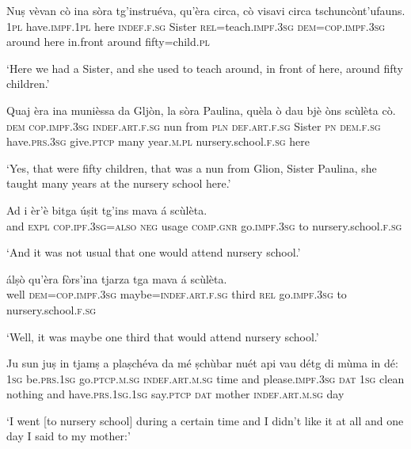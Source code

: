 \begin{linenumbers}
\gll Nuṣ vèvan cò ina sòra tg'instruéva, qu'èra circa, cò visavi circa tschuncònt’ufauns. \\
\textsc{1pl} have.\textsc{impf.1pl} here \textsc{indef.f.sg} Sister \textsc{rel}=teach.\textsc{impf.3sg} \textsc{dem=cop.impf.3sg} around here in.front around fifty=child.\textsc{pl}\\
\end{linenumbers}
\medskip
\glt `Here we had a Sister, and she used to teach around, in front of here, around fifty children.'
\medskip

\begin{linenumbers}
\gll Quaj èra ina munièssa da Gljòn, la sòra Paulina, quèla ò dau bjè òns scùlèta cò.   \\
\textsc{dem} \textsc{cop.impf.3sg} \textsc{indef.art.f.sg} nun from \textsc{pln} \textsc{def.art.f.sg} Sister \textsc{pn} \textsc{dem.f.sg}  have.\textsc{prs.3sg} give.\textsc{ptcp} many year.\textsc{m.pl} nursery.school.\textsc{f.sg} here    \\
\end{linenumbers}
\medskip
\glt `Yes, that were fifty children, that was a nun from Glion, Sister Paulina, she taught many years at the nursery school here.'
\medskip

\begin{linenumbers}
\gll Ad i èr’è bitga úṣit tg’ins mava á scùlèta.   \\
and  \textsc{expl} \textsc{cop.ipf.3sg=also} \textsc{neg} usage  \textsc{comp}.\textsc{gnr}  go.\textsc{impf.3sg} to nursery.school.\textsc{f.sg}   \\
\end{linenumbers}
\medskip
\glt `And it was not usual that one would attend nursery school.'
\medskip

\begin{linenumbers}
\gll  álṣò qu’èra fòrs’ina tjarza tga mava á scùlèta.  \\
well \textsc{dem=cop.impf.3sg} maybe=\textsc{indef.art.f.sg} third \textsc{rel} go.\textsc{impf.3sg} to nursery.school.\textsc{f.sg}    \\
\end{linenumbers}
\medskip
\glt `Well, it was maybe one third that would attend nursery school.'
\medskip

\begin{linenumbers}
\gll  Ju sun juṣ in tjamṣ a plaṣchéva da mé ṣchùbar nuét api vau détg di  mùma in dé: \\
 \textsc{1sg} be.\textsc{prs.1sg} go.\textsc{ptcp.m.sg} \textsc{indef.art.m.sg} time and please.\textsc{impf.3sg} \textsc{dat} \textsc{1sg} clean nothing and have.\textsc{prs.1sg.1sg} say.\textsc{ptcp} \textsc{dat} mother \textsc{indef.art.m.sg} day   \\
\end{linenumbers}
\medskip
\glt `I went [to nursery school] during a certain time and I didn’t like it at all and one day I said to my mother:'
\medskip


